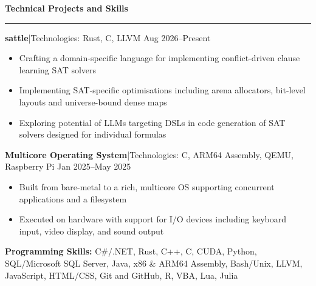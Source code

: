 \documentclass[11pt,letterpaper]{article}
\newcommand{\horibar}[2]{#1\hspace{5pt}|\hspace{5pt}#2}
\newcommand{\sep}[1]{\par\vspace{#1}}
\renewenvironment{section}[1]{
\sep{11pt}
{
\fontsize{14}{2}
\selectfont
\textbf{#1}\\[0.5pt]
}
\sep{4pt}
\noindent\rule{\linewidth}{0.5pt}
\sep{4pt}
}
{
}
\renewenvironment{subsection}[3]
{
\sep{4pt}
\horibar{\textbf{#1}}{#2} \hfill #3
\par\setstretch{1}
\begin{itemize}
}
{
\end{itemize}
\setstretch{0}
}
\begin{document}
\begin{section}{Technical Projects and Skills}
    \begin{subsection}{sattle}{Technologies: Rust, C, LLVM}{Aug 2026–Present}
        \item Crafting a domain-specific language for implementing conflict-driven clause learning SAT solvers
        \item Implementing SAT-specific optimisations including arena allocators, bit-level layouts and universe-bound dense maps
        \item Exploring potential of LLMs targeting DSLs in code generation of SAT solvers designed for individual formulas
    \end{subsection}
    \begin{subsection}{Multicore Operating System}{Technologies: C, ARM64 Assembly, QEMU, Raspberry Pi}{Jan 2025–May 2025}
        \item Built from bare-metal to a rich, multicore OS supporting concurrent applications and a filesystem
        \item Executed on hardware with support for I/O devices including keyboard input, video display, and sound output
    \end{subsection}
    {
    \sep{2pt}
    \textbf{Programming Skills:} C\#/.NET, Rust, C++, C, CUDA, Python, SQL/Microsoft SQL Server, Java, x86 \& ARM64 Assembly, Bash/Unix, LLVM, JavaScript, HTML/CSS, Git and GitHub, R, VBA, Lua, Julia
    \par{}
    \sep{2pt}
    }
\end{section}
\end{document}
